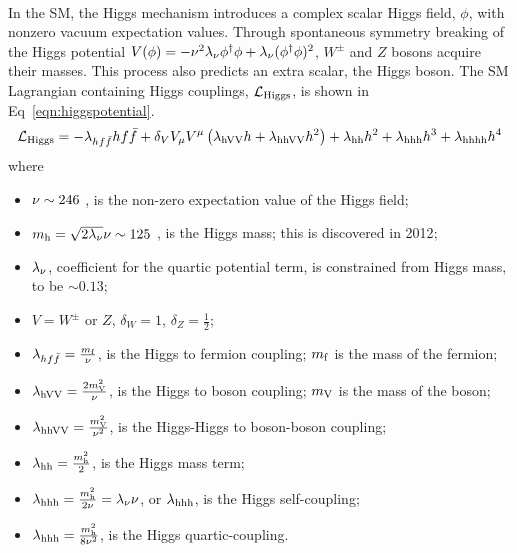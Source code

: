 \paragraph{}
In the SM, the Higgs mechanism introduces a complex scalar Higgs field, $\phi$, with nonzero vacuum expectation values. Through spontaneous symmetry breaking of the Higgs potential $V(\phi) = -\nu^2\lambda_{\rm \nu} \phi^{\dagger}\phi + \lambda_{\rm \nu}(\phi^\dagger\phi)^2$, $W^{\pm}$ and $Z$ bosons acquire their masses. This process also predicts an extra scalar, the Higgs boson. The SM Lagrangian containing Higgs couplings, $\mathcal{L}_{\rm Higgs}$, is shown in Eq~\ref{eqn:higgspotential}.
\begin{equation}
\label{eqn:higgspotential}
\mathcal{L}_{\rm Higgs} = -\lambda_{hf\bar{f}} hf\bar{f} + \delta_{V} V_{\rm\mu} V^{\rm\mu}\left(\lambda_{\rm hVV} h + \lambda_{\rm hhVV}h^2\right) + \lambda_{\rm hh}h^2 + \lambda_{\rm hhh}h^3 + \lambda_{\rm hhhh}h^4 
\end{equation}
where 
\begin{itemize}
	\item $\rm\nu \sim 246$ \GeV, is the non-zero expectation value of the Higgs field;\
	\item $m_{\rm h} = \sqrt{2\lambda_{\rm \nu}}\nu \sim 125$ \GeV, is the Higgs mass; this is discovered in 2012\cite{ATLASHiggsDisc, CMSHiggsDisc}; 
	\item $\lambda_{\rm \nu}$, coefficient for the quartic potential term, is constrained from Higgs mass, to be $\sim 0.13$;
	\item $V = W^{\pm}$ or $Z$, $\delta_{W} = 1$, $\delta_{Z} = \frac{1}{2}$;
	\item $\lambda_{hf\bar{f}} = \frac{m_{\rm f}}{\rm\nu}$, is the Higgs to fermion coupling; $m_{\rm f}$ is the mass of the fermion;
	\item $\lambda_{\rm hVV} = \frac{2m_{\rm V}^2}{\rm\nu}$, is the Higgs to boson coupling; $m_{\rm V}$ is the mass of the boson;
	\item $\lambda_{\rm hhVV} = \frac{m_{\rm V}^2}{\rm\nu^2}$, is the Higgs-Higgs to boson-boson coupling;
	\item $\lambda_{\rm hh} = \frac{m_{\rm h}^2}{2}$, is the Higgs mass term;
	\item $\lambda_{\rm hhh} = \frac{m_{\rm h}^2}{2\rm\nu} = \lambda_{\rm \nu} \nu$, or $\lambda_{\rm hhh}$, is the Higgs self-coupling;
	\item $\lambda_{\rm hhh} = \frac{m_{\rm h}^2}{8\rm\nu^2}$, is the Higgs quartic-coupling.
\end{itemize}
